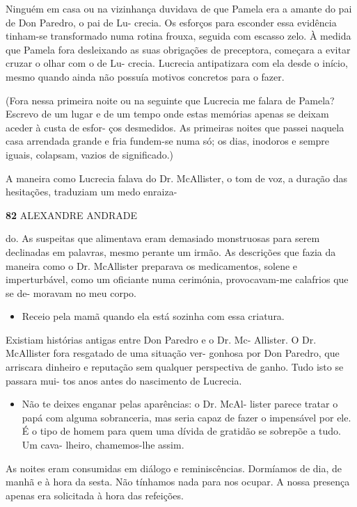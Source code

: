 Ninguém em casa ou na vizinhança duvidava de que Pamela era a amante do
pai de Don Paredro, o pai de Lu- crecia. Os esforços para esconder essa
evidência tinham-se transformado numa rotina frouxa, seguida com escasso
zelo. À medida que Pamela fora desleixando as suas obrigações de
preceptora, começara a evitar cruzar o olhar com o de Lu- crecia.
Lucrecia antipatizara com ela desde o início, mesmo quando ainda não
possuía motivos concretos para o fazer.

(Fora nessa primeira noite ou na seguinte que Lucrecia me falara de
Pamela? Escrevo de um lugar e de um tempo onde estas memórias apenas se
deixam aceder à custa de esfor- ços desmedidos. As primeiras noites que
passei naquela casa arrendada grande e fria fundem-se numa só; os dias,
inodoros e sempre iguais, colapsam, vazios de significado.)

A maneira como Lucrecia falava do Dr. McAllister, o tom de voz, a
duração das hesitações, traduziam um medo enraiza-

\textbf{82 }ALEXANDRE ANDRADE

do. As suspeitas que alimentava eram demasiado monstruosas para serem
declinadas em palavras, mesmo perante um irmão. As descrições que fazia
da maneira como o Dr. McAllister preparava os medicamentos, solene e
imperturbável, como um oficiante numa cerimónia, provocavam-me calafrios
que se de- moravam no meu corpo.

\begin{itemize}
\tightlist
\item
  Receio pela mamã quando ela está sozinha com essa criatura.
\end{itemize}

Existiam histórias antigas entre Don Paredro e o Dr. Mc- Allister. O Dr.
McAllister fora resgatado de uma situação ver- gonhosa por Don Paredro,
que arriscara dinheiro e reputação sem qualquer perspectiva de ganho.
Tudo isto se passara mui- tos anos antes do nascimento de Lucrecia.

\begin{itemize}
\tightlist
\item
  Não te deixes enganar pelas aparências: o Dr. McAl- lister parece
  tratar o papá com alguma sobranceria, mas seria capaz de fazer o
  impensável por ele. É o tipo de homem para quem uma dívida de gratidão
  se sobrepõe a tudo. Um cava- lheiro, chamemos-lhe assim.
\end{itemize}

As noites eram consumidas em diálogo e reminiscências. Dormíamos de dia,
de manhã e à hora da sesta. Não tínhamos nada para nos ocupar. A nossa
presença apenas era solicitada à hora das refeições.

